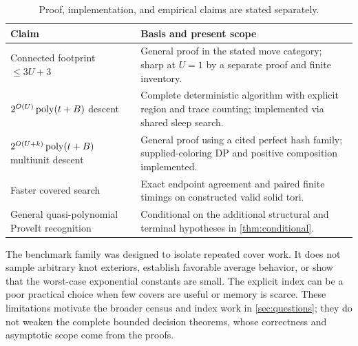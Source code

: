 \begin{table}[ht]
\centering\small
\begin{tabularx}{\textwidth}{@{}p{}X@{}}
\toprule
Claim & Basis and present scope\\
\midrule
Connected footprint $\le3U+3$ & General proof in the stated move category;
sharp at $U=1$ by a separate proof and finite inventory.\\
$2^{O(U)}\operatorname{poly}(t+B)$ descent & Complete deterministic algorithm with explicit
region and trace counting; implemented via shared sleep search.\\
$2^{O(U+k)}\operatorname{poly}(t+B)$ multiunit descent & General proof using a cited perfect
hash family; supplied-coloring DP and positive composition implemented.\\
Faster covered search & Exact endpoint agreement and paired finite timings
on constructed valid solid tori.\\
General quasi-polynomial ProveIt recognition & Conditional on the additional
structural and terminal hypotheses in \cref{thm:conditional}.\\
\bottomrule
\end{tabularx}
\caption{Proof, implementation, and empirical claims are stated separately.}
\end{table}

The benchmark family was designed to isolate repeated cover work. It does
not sample arbitrary knot exteriors, establish favorable average behavior,
or show that the worst-case exponential constants are small. The explicit
index can be a poor practical choice when few covers are useful or memory
is scarce. These limitations motivate the broader census and index work in
\cref{sec:questions}; they do not weaken the complete bounded decision
theorems, whose correctness and asymptotic scope come from the proofs.
